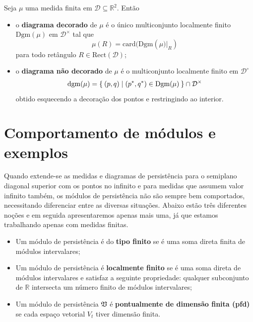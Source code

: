 \begin{defi} 
    Seja $\mu$ uma medida finita em $\mathcal{D} \subseteq \mathbb{R}^2$. Então
    \begin{itemize}
        \item o \textbf{diagrama decorado} de $\mu$ é o único multiconjunto localmente finito
        $\text{Dgm}(\mu)$ em $\mathcal{D}^{\times}$ tal que 
        \begin{equation*}
            \mu(R) = \text{card}(\text{Dgm}(\mu\left.)\right|_R)
        \end{equation*}
        para todo retângulo $R \in \text{Rect}(\mathcal{D})$;
        \item o \textbf{diagrama não decorado} de $\mu$ é o multiconjunto localmente finito em 
        $\mathcal{D}^{\circ}$
        \begin{equation*}
            \text{dgm}(\mu) = \Set{(p,q) | (p^*, q^*) \in \text{Dgm}(\mu)} \cap \mathcal{D}^\times 
        \end{equation*}
        obtido esquecendo a decoração dos pontos e restringindo ao interior. 
    \end{itemize}
\end{defi}

\section{Comportamento de módulos e exemplos}

Quando extende-se as medidas e diagramas de persistência para o semiplano diagonal superior com os 
pontos no infinito e para medidas que assumem valor infinito também, os módulos de persistência não são
sempre bem comportados, necessitando diferenciar entre as diversas situações.
Abaixo estão três diferentes noções e em seguida apresentaremos apenas mais uma, já que estamos trabalhando
apenas com medidas finitas. 

\begin{itemize}
    \item Um módulo de persistência é do \textbf{tipo finito} se é uma soma direta finita de módulos intervalares;
    \item Um módulo de persistência é \textbf{localmente finito} se é uma soma direta de módulos intervalares
    e satisfaz a seguinte propriedade: qualquer subconjunto de $\mathbb{R}$ intersecta um número finito de 
    módulos intervalares;
    \item Um módulo de persistência $\mathfrak{V}$ é \textbf{pontualmente de dimensão finita (pfd)} se cada espaço
    vetorial $V_t$ tiver dimensão finita. 
\end{itemize}

